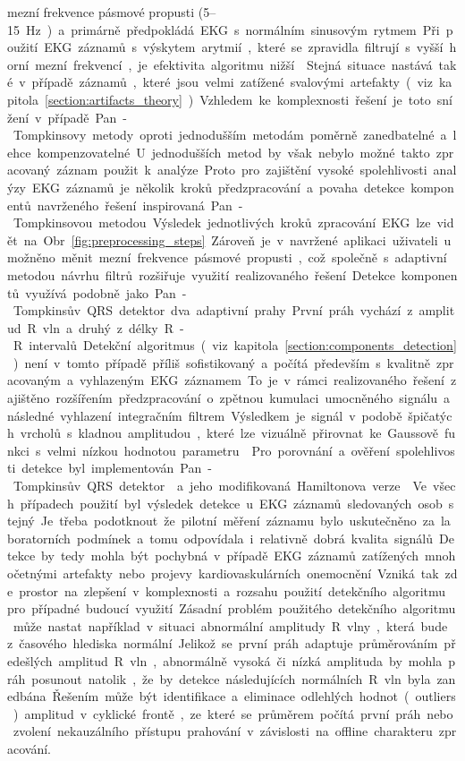 mezní frekvence pásmové propusti (5--15~\si\Hz) a primárně předpokládá EKG s
normálním sinusovým rytmem. Při použití EKG záznamů s výskytem arytmií, které se
zpravidla filtrují s vyšší horní mezní frekvencí, je efektivita algoritmu
nižší~\cite{Fariha2020}. Stejná situace nastává také v případě záznamů, které
jsou velmi zatížené svalovými artefakty (viz
kapitola~\ref{section:artifacts_theory}). Vzhledem ke komplexnosti řešení je
toto snížení v případě Pan-Tompkinsovy metody oproti jednodušším metodám poměrně
zanedbatelné a lehce kompenzovatelné. U jednodušších metod by však nebylo možné
takto zpracovaný záznam použit k analýze. Proto pro zajištění vysoké
spolehlivosti analýzy EKG záznamů je několik kroků předzpracování a povaha
detekce komponentů navrženého řešení inspirovaná Pan-Tompkinsovou metodou.
Výsledek jednotlivých kroků zpracování EKG lze vidět na
Obr.~\ref{fig:preprocessing_steps}. Zároveň je v navržené aplikaci uživateli
umožněno měnit mezní frekvence pásmové propusti, což společně s adaptivní
metodou návrhu filtrů rozšiřuje využití realizovaného řešení.

Detekce komponentů využívá podobně jako Pan-Tompkinsův QRS detektor dva
adaptivní prahy. První práh vychází z amplitud R vln a druhý z délky R-R
intervalů. Detekční algoritmus (viz kapitola~\ref{section:components_detection})
není v tomto případě příliš sofistikovaný a počítá především s kvalitně
zpracovaným a vyhlazeným EKG záznamem. To je v rámci realizovaného řešení
zajištěno rozšířením předzpracování o zpětnou kumulaci umocněného signálu a
následné vyhlazení integračním filtrem. Výsledkem je signál v podobě špičatých
vrcholů s kladnou amplitudou, které lze vizuálně přirovnat ke Gaussově funkci s
velmi nízkou hodnotou parametru~\textsigma. Pro porovnání a ověření
spolehlivosti detekce byl implementován Pan-Tompkinsův QRS
detektor~\cite{Pan1985} a jeho modifikovaná Hamiltonova
verze~\cite{Hamilton1987}. Ve všech případech použití byl výsledek detekce u EKG
záznamů sledovaných osob stejný. Je třeba podotknout že pilotní měření záznamu
bylo uskutečněno za laboratorních podmínek a tomu odpovídala i relativně dobrá
kvalita signálů. Detekce by tedy mohla být pochybná v případě EKG záznamů
zatížených mnohočetnými artefakty nebo projevy kardiovaskulárních onemocnění.
Vzniká tak zde prostor na zlepšení v komplexnosti a rozsahu použití detekčního
algoritmu pro případné budoucí využití. Zásadní problém použitého detekčního
algoritmu může nastat například v situaci abnormální amplitudy R vlny, která
bude z časového hlediska normální. Jelikož se první práh adaptuje průměrováním
předešlých amplitud R vln, abnormálně vysoká či nízká amplituda by mohla práh
posunout natolik, že by detekce následujících normálních R vln byla zanedbána.
Řešením může být identifikace a eliminace odlehlých hodnot (outliers)
amplitud v cyklické frontě, ze které se průměrem počítá první práh nebo zvolení
nekauzálního přístupu prahování v závislosti na offline charakteru zpracování.

